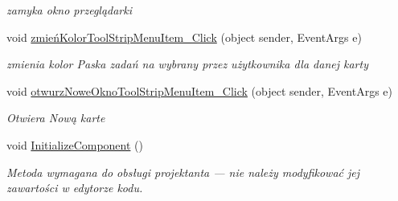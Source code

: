 \begin{DoxyCompactItemize}
\begin{DoxyCompactList}\small\item\em zamyka okno przeglądarki \end{DoxyCompactList}\item 
void \mbox{\hyperlink{class_proj__przegladarka_1_1_form1_ad76d716c27e1c1dd47eb158d25437b96}{zmień\+Kolor\+Tool\+Strip\+Menu\+Item\+\_\+\+Click}} (object sender, Event\+Args e)
\begin{DoxyCompactList}\small\item\em zmienia kolor Paska zadań na wybrany przez użytkownika dla danej karty \end{DoxyCompactList}\item 
void \mbox{\hyperlink{class_proj__przegladarka_1_1_form1_ae9fab4c2fdb6d2088e564c3accefe0af}{otwurz\+Nowe\+Okno\+Tool\+Strip\+Menu\+Item\+\_\+\+Click}} (object sender, Event\+Args e)
\begin{DoxyCompactList}\small\item\em Otwiera Nową karte \end{DoxyCompactList}\item 
void \mbox{\hyperlink{class_proj__przegladarka_1_1_form1_a2fc892b8bc9dc90f327be70082d9c7a0}{Initialize\+Component}} ()
\begin{DoxyCompactList}\small\item\em Metoda wymagana do obsługi projektanta — nie należy modyfikować jej zawartości w edytorze kodu. \end{DoxyCompactList}\end{DoxyCompactItemize}
